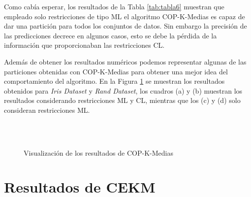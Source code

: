 Como cabía esperar, los resultados de la Tabla \ref{tab:tabla6} muestran que empleado solo restricciones de tipo \acs{ML} el algoritmo COP-K-Medias es capaz de dar una partición para todos los conjuntos de datos. Sin embargo la precisión de las predicciones decrece en algunos casos, esto se debe la pérdida de la información que proporcionaban las restricciones \acs{CL}. 

Además de obtener los resultados numéricos podemos representar algunas de las particiones obtenidas con COP-K-Medias para obtener una mejor idea del comportamiento del algoritmo. En la Figura \ref{fig:figure24} se muestran los resultados obtenidos para \textit{Iris Dataset} y \textit{Rand Dataset}, los cuadros (a) y (b) muestran los resultados considerando restricciones ML y CL, mientras que los (c) y (d) solo consideran restricciones ML.

\begin{figure}[bth]
	\myfloatalign
	\\
	\\
	\caption{Visualización de los resultados de COP-K-Medias}\label{fig:figure24}
\end{figure}

\section{Resultados de CEKM}



